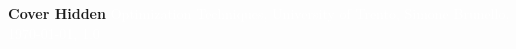 \documentclass[11pt,fleqn,oneside]{book} %
\newcommand{\AUTHOR}{Simone Brunello}
\newcommand{\DATE}{\today}
\newcommand{\VERSION}{1.0}
\newcommand{\TITLE}{Optimization Techniques}
\newcommand{\SUBTITLE}{University of Trento}
\renewcommand{\coverpage}[5]{{\Huge\textbf{Cover Hidden}}
    \textcolor{white}{#1, #2, #3, #4, #5}}
\begin{document}
    \coverpage{\TITLE}{\SUBTITLE}{\AUTHOR}{\DATE}{\VERSION}

    \newpage

    
\end{document}
